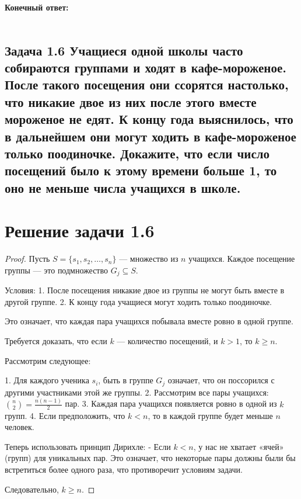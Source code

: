 \documentclass[12pt]{article}
\begin{document}
\vspace{0.5cm}
\noindent
\textbf{Конечный ответ:} \\
\\

\subsection*{Задача 1.6 Учащиеся одной школы часто собираются группами и ходят в кафе-мороженое. После такого посещения они ссорятся настолько, что никакие двое из них после этого вместе мороженое не едят. К концу года выяснилось, что в дальнейшем они могут ходить в кафе-мороженое только поодиночке. Докажите, что если число посещений было к этому времени больше 1, то оно не меньше числа учащихся в школе.}

\section*{Решение задачи 1.6}

\begin{proof}
Пусть $S = \{s_1, s_2, \dots, s_n\}$ — множество из $n$ учащихся.
Каждое посещение группы — это подмножество $G_j \subseteq S$.

Условия:
1. После посещения никакие двое из группы не могут быть вместе в другой группе. 
2. К концу года учащиеся могут ходить только поодиночке.

Это означает, что каждая пара учащихся побывала вместе ровно в одной группе.

Требуется доказать, что если $k$ — количество посещений, и $k > 1$, то $k \ge n$.

Рассмотрим следующее:

1. Для каждого ученика $s_i$, быть в группе $G_j$ означает, что он поссорился с другими участниками этой же группы.
2. Рассмотрим все пары учащихся: $\binom{n}{2} = \frac{n(n-1)}{2}$ пар.
3. Каждая пара учащихся появляется ровно в одной из $k$ групп.
4. Если предположить, что $k < n$, то в каждой группе будет меньше $n$ человек.

Теперь использовать принцип Дирихле:
- Если $k < n$, у нас не хватает «ячей» (групп) для уникальных пар. Это означает, что некоторые пары должны были бы встретиться более одного раза, что противоречит условиям задачи.

Следовательно, $k \ge n$.
\end{proof}
\end{document}
